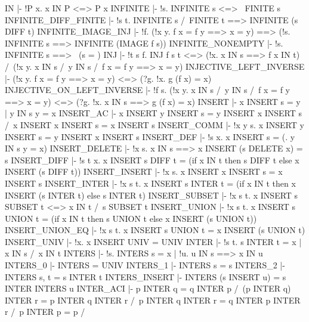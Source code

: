 \ENDTHEOREM
\THEOREM IN
  |- !P x. x IN P <=> P x
\ENDTHEOREM
\THEOREM INFINITE
  |- !s. INFINITE s <=> ~FINITE s
\ENDTHEOREM
\THEOREM INFINITE\_DIFF\_FINITE
  |- !s t. INFINITE s /\ FINITE t ==> INFINITE (s DIFF t)
\ENDTHEOREM
\THEOREM INFINITE\_IMAGE\_INJ
  |- !f. (!x y. f x = f y ==> x = y)
         ==> (!s. INFINITE s ==> INFINITE (IMAGE f s))
\ENDTHEOREM
\THEOREM INFINITE\_NONEMPTY
  |- !s. INFINITE s ==> ~(s = {})
\ENDTHEOREM
\THEOREM INJ
  |- !t s f.
         INJ f s t <=>
         (!x. x IN s ==> f x IN t) /\
         (!x y. x IN s /\ y IN s /\ f x = f y ==> x = y)
\ENDTHEOREM
\THEOREM INJECTIVE\_LEFT\_INVERSE
  |- (!x y. f x = f y ==> x = y) <=> (?g. !x. g (f x) = x)
\ENDTHEOREM
\THEOREM INJECTIVE\_ON\_LEFT\_INVERSE
  |- !f s.
         (!x y. x IN s /\ y IN s /\ f x = f y ==> x = y) <=>
         (?g. !x. x IN s ==> g (f x) = x)
\ENDTHEOREM
\THEOREM INSERT
  |- x INSERT s = {y | y IN s \/ y = x}
\ENDTHEOREM
\THEOREM INSERT\_AC
  |- x INSERT y INSERT s = y INSERT x INSERT s /\
     x INSERT x INSERT s = x INSERT s
\ENDTHEOREM
\THEOREM INSERT\_COMM
  |- !x y s. x INSERT y INSERT s = y INSERT x INSERT s
\ENDTHEOREM
\THEOREM INSERT\_DEF
  |- !s x. x INSERT s = (\y. y IN s \/ y = x)
\ENDTHEOREM
\THEOREM INSERT\_DELETE
  |- !x s. x IN s ==> x INSERT (s DELETE x) = s
\ENDTHEOREM
\THEOREM INSERT\_DIFF
  |- !s t x.
         x INSERT s DIFF t =
         (if x IN t then s DIFF t else x INSERT (s DIFF t))
\ENDTHEOREM
\THEOREM INSERT\_INSERT
  |- !x s. x INSERT x INSERT s = x INSERT s
\ENDTHEOREM
\THEOREM INSERT\_INTER
  |- !x s t.
         x INSERT s INTER t =
         (if x IN t then x INSERT (s INTER t) else s INTER t)
\ENDTHEOREM
\THEOREM INSERT\_SUBSET
  |- !x s t. x INSERT s SUBSET t <=> x IN t /\ s SUBSET t
\ENDTHEOREM
\THEOREM INSERT\_UNION
  |- !x s t.
         x INSERT s UNION t =
         (if x IN t then s UNION t else x INSERT (s UNION t))
\ENDTHEOREM
\THEOREM INSERT\_UNION\_EQ
  |- !x s t. x INSERT s UNION t = x INSERT (s UNION t)
\ENDTHEOREM
\THEOREM INSERT\_UNIV
  |- !x. x INSERT UNIV = UNIV
\ENDTHEOREM
\THEOREM INTER
  |- !s t. s INTER t = {x | x IN s /\ x IN t}
\ENDTHEOREM
\THEOREM INTERS
  |- !s. INTERS s = {x | !u. u IN s ==> x IN u}
\ENDTHEOREM
\THEOREM INTERS\_0
  |- INTERS {} = UNIV
\ENDTHEOREM
\THEOREM INTERS\_1
  |- INTERS {s} = s
\ENDTHEOREM
\THEOREM INTERS\_2
  |- INTERS {s, t} = s INTER t
\ENDTHEOREM
\THEOREM INTERS\_INSERT
  |- INTERS (s INSERT u) = s INTER INTERS u
\ENDTHEOREM
\THEOREM INTER\_ACI
  |- p INTER q = q INTER p /\
     (p INTER q) INTER r = p INTER q INTER r /\
     p INTER q INTER r = q INTER p INTER r /\
     p INTER p = p /\
